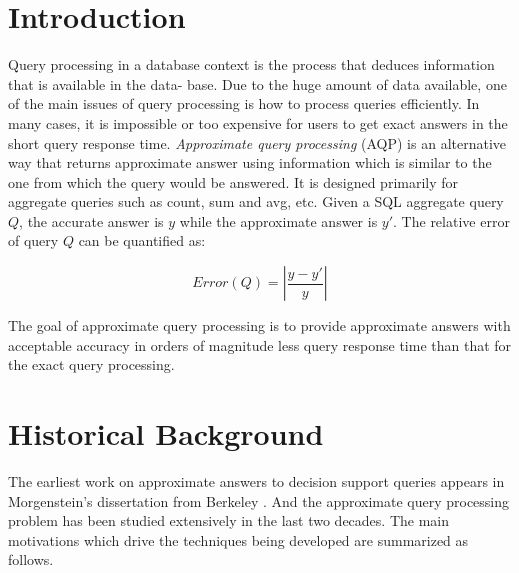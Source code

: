 \documentclass[twocolumn]{article}
\newcommand*\DNA{\textsc{dna}}
\newcommand*\Let[2]{\State #1 $\gets$ #2}
\begin{document}


\section{Introduction}
Query processing in a database context is the process that deduces information that is available in the data- base. Due to the huge amount of data available, one of the main issues of query processing is how to process queries efficiently. In many cases, it is impossible or too expensive for users to get exact answers in the short query response time. \textit{Approximate query processing} (AQP) is an alternative way that returns approximate answer using information which is similar to the one from which the query would be answered. 
It is designed primarily for aggregate queries such as count, sum and avg, etc. 
Given a SQL aggregate query $Q$, the accurate answer is $y$ while the approximate answer is $y'$. 
The relative error of query $Q$ can be quantified as:

\begin{equation}
\textit{Error}(Q) = |\frac{y-y'}{y}|
\end{equation}

The goal of approximate query processing is to provide approximate answers with acceptable accuracy in orders of magnitude less query response time than that for the exact query processing.

\section{Historical Background}
The earliest work on approximate answers to decision support queries appears in Morgenstein’s dissertation from Berkeley \cite{Morgenstein:1981}. 
And the approximate query processing problem has been studied extensively in the last two decades. 
The main motivations \cite{Garofalakis:2001} which drive the techniques being developed are summarized as follows.
\end{document}
